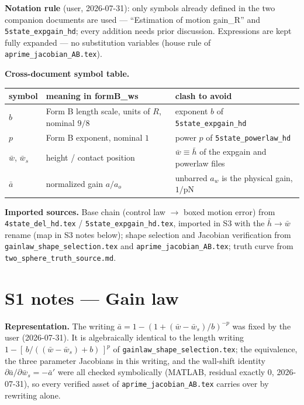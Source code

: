 \documentclass[11pt,a4paper,fontset=none]{ctexart}
\begin{document}
\textbf{Notation rule} (user, 2026-07-31): only symbols already defined in
the two companion documents are used --- ``Estimation of motion gain\_R''
and \texttt{5state\_expgain\_hd}; every addition needs prior discussion.
Expressions are kept fully expanded --- no substitution variables (house
rule of \texttt{aprime\_jacobian\_AB.tex}).

\textbf{Cross-document symbol table.}
\begin{center}
\begin{tabular}{lll}
\toprule
symbol & meaning in formB\_ws & clash to avoid \\
\midrule
$b$ & Form B length scale, units of $R$, nominal $9/8$ &
  exponent $b$ of \texttt{5state\_expgain\_hd} \\
$p$ & Form B exponent, nominal $1$ &
  power $p$ of \texttt{5state\_powerlaw\_hd} \\
$\bar{w}$, $\bar{w}_s$ & height / contact position &
  $\bar{w} \equiv \bar{h}$ of the expgain and powerlaw files \\
$\bar{a}$ & normalized gain $a/a_o$ &
  unbarred $a_w$ is the physical gain, $1/\mathrm{pN}$ \\
\bottomrule
\end{tabular}
\end{center}

\textbf{Imported sources.}  Base chain (control law $\to$ boxed motion error)
from \texttt{4state\_del\_hd.tex} / \texttt{5state\_expgain\_hd.tex},
imported in S3 with the $\bar{h}\to\bar{w}$ rename (map in S3 notes below);
shape selection and Jacobian verification from
\texttt{gainlaw\_shape\_selection.tex} and \texttt{aprime\_jacobian\_AB.tex};
truth curve from \texttt{two\_sphere\_truth\_source.md}.

\section*{S1 notes --- Gain law}

\textbf{Representation.}  The writing
$\bar{a} = 1 - (1 + (\bar{w}-\bar{w}_s)/b)^{-p}$ was fixed by the user
(2026-07-31).  It is algebraically identical to the length writing
$1 - [\,b/((\bar{w}-\bar{w}_s)+b)\,]^{p}$ of
\texttt{gainlaw\_shape\_selection.tex}; the equivalence, the three parameter
Jacobians in this writing, and the wall-shift identity
$\partial\bar{a}/\partial\bar{w}_s = -\bar{a}'$ were all checked symbolically
(MATLAB, residual exactly $0$, 2026-07-31), so every verified asset of
\texttt{aprime\_jacobian\_AB.tex} carries over by rewriting alone.
\end{document}
